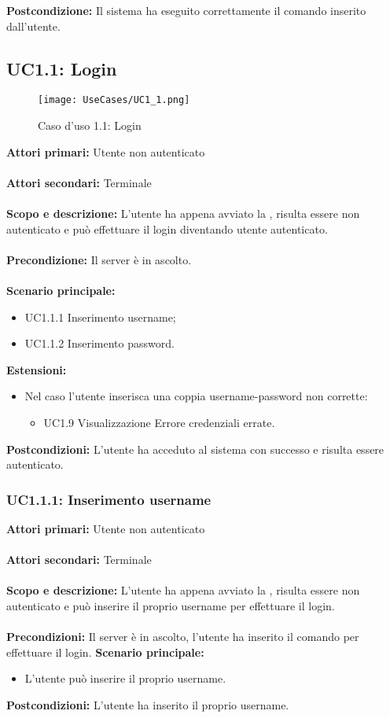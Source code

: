 \documentclass{scalatekids-article}
\begin{document}
\textbf{Postcondizione:} Il sistema ha eseguito correttamente il comando inserito dall'utente.


\subsection{UC1.1: Login}
\begin{figure}[H]
  \begin{center}
    \texttt{[image: UseCases/UC1\_1.png]}
    \caption*{Caso d'uso 1.1: Login}
  \end{center}
\end{figure}
\textbf{Attori primari:} Utente non autenticato\\ \\
\textbf{Attori secondari:} Terminale\\ \\
\textbf{Scopo e descrizione:}
L’utente ha appena avviato la , risulta essere non autenticato e può effettuare il login diventando utente
autenticato.\\ \\
\textbf{Precondizione:} Il server è in ascolto.\\ \\
\textbf{Scenario principale:}
\begin{itemize}
  \item UC1.1.1 Inserimento username;
  \item UC1.1.2 Inserimento password.
\end{itemize}
\textbf{Estensioni:}
\begin{itemize}
\item Nel caso l'utente inserisca una coppia username-password non corrette:
  \begin{itemize}
  \item UC1.9 Visualizzazione Errore credenziali errate.
  \end{itemize}
\end{itemize}
\textbf{Postcondizioni:} L'utente ha acceduto al sistema con successo e risulta essere autenticato.

\subsubsection{UC1.1.1: Inserimento username}

\textbf{Attori primari:} Utente non autenticato\\ \\
\textbf{Attori secondari:} Terminale\\ \\
\textbf{Scopo e descrizione:}
L'utente ha appena avviato la , risulta essere non autenticato e può inserire il proprio username per effettuare il login.\\ \\
\textbf{Precondizioni:} Il server è in ascolto, l'utente ha inserito il comando per effettuare il login.
\textbf{Scenario principale:}
\begin{itemize}
  \item L'utente può inserire il proprio username.
\end{itemize}
\textbf{Postcondizioni:} L'utente ha inserito il proprio username.
\end{document}
